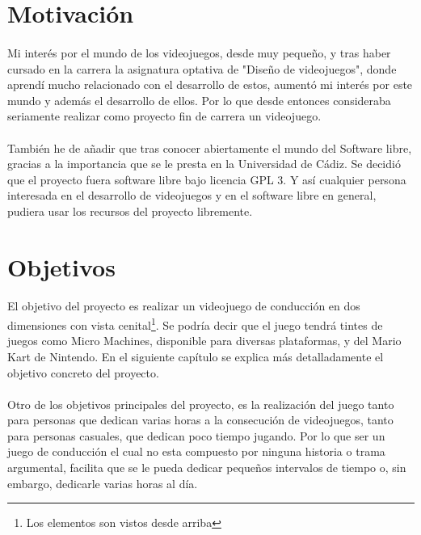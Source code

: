 \section{Motivación}

\paragraph{}
Mi interés por el mundo de los videojuegos, desde muy pequeño, y tras haber cursado en la carrera
la asignatura optativa de "Diseño de videojuegos", donde aprendí mucho
relacionado con el desarrollo de estos,
aumentó mi interés por este mundo y además el desarrollo de ellos. Por lo que desde entonces consideraba seriamente realizar 
como proyecto fin de carrera un videojuego.

\paragraph{}
También he de añadir que tras conocer abiertamente el mundo del Software libre, gracias a la importancia que se le presta
en la Universidad de Cádiz. Se decidió que el proyecto fuera software libre bajo licencia GPL 3. Y así cualquier persona
interesada en el desarrollo de videojuegos y en el software libre en general, pudiera usar los recursos del proyecto
libremente.

\section{Objetivos}

\paragraph{}
El objetivo del proyecto es realizar un videojuego de conducción en dos dimensiones con vista cenital\footnote{Los elementos son
vistos desde arriba}. Se podría decir que el juego tendrá tintes de juegos como Micro Machines, disponible para diversas 
plataformas, y del Mario Kart de Nintendo. En el siguiente capítulo se explica más detalladamente el objetivo 
concreto del proyecto.

\paragraph{}
Otro de los objetivos principales del proyecto, es la realización del juego tanto para personas que
dedican varias horas a la consecución de videojuegos, tanto para personas casuales, que dedican poco tiempo
jugando. Por lo que ser un juego de conducción el cual no esta compuesto por ninguna historia o trama argumental, facilita que se 
le pueda dedicar pequeños intervalos de tiempo o, sin embargo, dedicarle varias horas al día.

